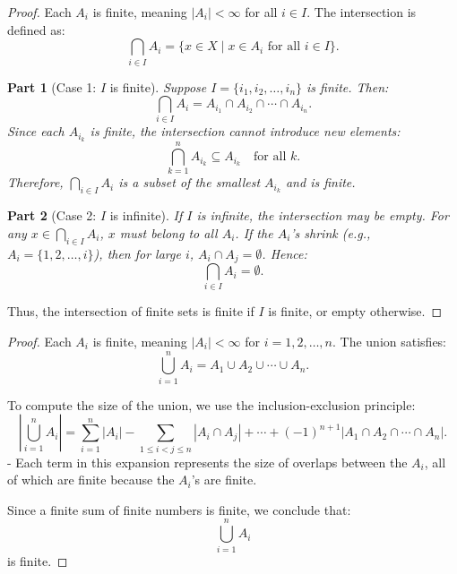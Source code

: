 \documentclass[11pt,openany]{article}
\begin{document}
\newpage
{}
\newtheorem{proofpart}{Part}
\begin{proof}
	Each \( A_i \) is finite, meaning \( |A_i| < \infty \) for all \( i \in I \). The intersection is defined as:
	\[
	\bigcap_{i \in I} A_i = \{x \in X \mid x \in A_i \text{ for all } i \in I\}.
	\]
	
	\begin{proofpart}[Case 1: \( I \) is finite]
		Suppose \( I = \{i_1, i_2, \dots, i_n\} \) is finite. Then:
		\[
		\bigcap_{i \in I} A_i = A_{i_1} \cap A_{i_2} \cap \cdots \cap A_{i_n}.
		\]
		Since each \( A_{i_k} \) is finite, the intersection cannot introduce new elements:
		\[
		\bigcap_{k=1}^n A_{i_k} \subseteq A_{i_k} \quad \text{for all } k.
		\]
		Therefore, \( \bigcap_{i \in I} A_i \) is a subset of the smallest \( A_{i_k} \) and is finite.
		
	\end{proofpart}
	
	\begin{proofpart}[Case 2: \( I \) is infinite]
		If \( I \) is infinite, the intersection may be empty. For any \( x \in \bigcap_{i \in I} A_i \), \( x \) must belong to all \( A_i \). If the \( A_i \)'s shrink (e.g., \( A_i = \{1, 2, \dots, i\} \)), then for large \( i \), \( A_i \cap A_j = \emptyset \). Hence:
		\[
		\bigcap_{i \in I} A_i = \emptyset.
		\]
	\end{proofpart}
	
	Thus, the intersection of finite sets is finite if \( I \) is finite, or empty otherwise.
\end{proof}

\begin{proof}
	Each \( A_i \) is finite, meaning \( |A_i| < \infty \) for \( i = 1, 2, \dots, n \). The union satisfies:
	\[
	\bigcup_{i=1}^n A_i = A_1 \cup A_2 \cup \cdots \cup A_n.
	\]
	
	To compute the size of the union, we use the inclusion-exclusion principle:
	\[
	\left| \bigcup_{i=1}^n A_i \right| = \sum_{i=1}^n |A_i| - \sum_{1 \leq i < j \leq n} |A_i \cap A_j| + \cdots + (-1)^{n+1} |A_1 \cap A_2 \cap \cdots \cap A_n|.
	\]
	- Each term in this expansion represents the size of overlaps between the \( A_i \), all of which are finite because the \( A_i \)'s are finite.
	
	Since a finite sum of finite numbers is finite, we conclude that:
	\[
	\bigcup_{i=1}^n A_i
	\]
	is finite.
\end{proof}
\end{document}
